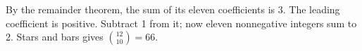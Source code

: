 By the remainder theorem, the sum of its eleven coefficients is $3$. The leading coefficient is positive. Subtract 1 from it; now eleven nonnegative integers sum to 2. Stars and bars gives $\binom{12}{10}=\boxed{66}$.
